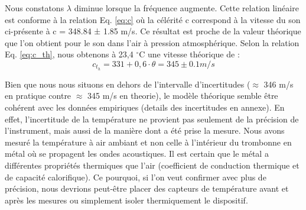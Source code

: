 Nous constatons \(\lambda\) diminue lorsque la fréquence augmente. Cette relation linéaire est conforme à la relation Eq. \ref{eq:c} où la célérité c correspond à la vitesse du son ci-présente à c = 348.84 ± 1.85 m/s. Ce résultat est proche de la valeur théorique que l'on obtient pour le son dans l'air à pression atmosphérique. Selon la relation Eq. \ref{eq:c_th}, nous obtenons à 23,4 $^\circ$C une vitesse théorique de :
\[
    c_t_h =331+0,6\cdot \theta = 345 \pm 0.1 m/s
\]

Bien que nous nous situons en dehors de l'intervalle d'incertitudes ($\approx$ 346 m/s en pratique contre $\approx$ 345 m/s en theorie), le modèle théorique semble être cohérent avec les données empiriques (details des incertitudes en annexe). En effet, l'incertitude de la température ne provient pas seulement de la précision de l'instrument, mais aussi de la manière dont a été prise la mesure. Nous avons mesuré la température à air ambiant et non celle à l'intérieur du trombonne en métal où se propagent les ondes acoustiques. Il est certain que le métal a différentes propriétés thermiques que l'air (coefficient de conduction thermique et de capacité calorifique). Ce pourquoi, si l'on veut confirmer avec plus de précision, nous devrions peut-être placer des capteurs de température avant et après les mesures ou simplement isoler thermiquement le dispositif. 
